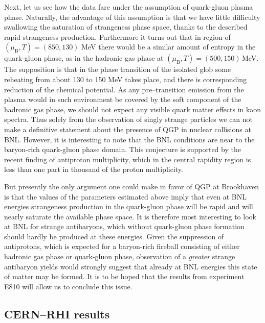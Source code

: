 \begin{mdframed}[linecolor=gray,roundcorner=12pt,backgroundcolor=Dandelion!15,linewidth=1pt,leftmargin=0cm,rightmargin=0cm,topline=true,bottomline=true,skipabove=12pt]
Next, let us see how the data fare under the assumption of quark-gluon plasma phase. Naturally, the advantage of this assumption is that we have little difficulty swallowing the saturation of strangeness phase space, thanks to the described rapid strangeness production. Furthermore it turns out that in region of $(\mu_\mathrm{B},T) = (850,130)$ MeV there would be a similar amount of entropy in the quark-gluon phase, as in the hadronic gas phase at $(\mu_\mathrm{B},T) = (500,150)$\,MeV. The supposition is that in the phase transition of the isolated glob some reheating from about 130 to 150 MeV takes place, and there is corresponding reduction of the chemical potential. As any pre--transition emission from the plasma would in such environment be covered by the soft component of the hadronic gas phase, we should not expect any visible quark matter effects in kaon spectra. Thus solely from the observation of singly strange particles we can not make a definitive statement about the presence of QGP in nuclear collisions at BNL. However, it is interesting to note that the BNL conditions are near to the baryon-rich quark-gluon phase domain. This conjecture is supported by the recent finding of antiproton multiplicity\footnotemark[25], which in the central rapidity region is less than one part in thousand of the proton multiplicity.  

But presently the only argument one could make in favor of QGP at Brookhaven is that the values of the parameters estimated above imply that even at BNL energies strangeness production in the quark-gluon phase will be rapid and will nearly saturate the available phase space. It is therefore most interesting to look at BNL for strange antibaryons, which without quark-gluon phase formation should hardly be produced at these energies. Given the suppression of antiprotons, which is expected for a baryon-rich fireball consisting of either hadronic gas phase or quark-gluon phase, observation of a {\em greater} strange antibaryon yields would strongly suggest that already at BNL energies this state of matter may be formed. It is to be hoped that the results from experiment E810 will allow us to conclude this issue.  

\subsection*{CERN--RHI results}


\end{mdframed}

